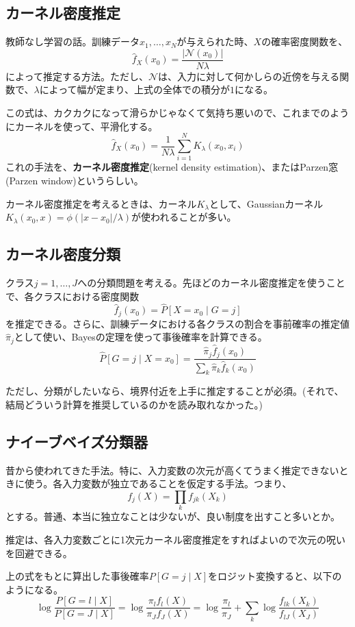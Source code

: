 \documentclass{jsarticle}
\begin{document}
\subsection{カーネル密度推定}
教師なし学習の話。訓練データ$x_{1},\dots,x_{N}$が与えられた時、$X$の確率密度関数を、
\[
  \hat{f}_{X}(x_{0})=\frac{|\mathcal{N}(x_{0})|}{N\lambda}
\]
によって推定する方法。ただし、$\mathcal{N}$は、入力に対して何かしらの近傍を与える関数で、$\lambda$によって幅が定まり、上式の全体での積分が$1$になる。

この式は、カクカクになって滑らかじゃなくて気持ち悪いので、これまでのようにカーネルを使って、平滑化する。
\[
  \hat{f}_{X}(x_{0})=\frac{1}{N\lambda}\sum_{i=1}^{N}K_{\lambda}(x_{0},x_{i})
\]
これの手法を、\textbf{カーネル密度推定}(kernel density estimation)、またはParzen窓(Parzen window)というらしい。

カーネル密度推定を考えるときは、カーネル$K_{\lambda}$として、Gaussianカーネル$K_{\lambda}(x_{0},x)=\phi(|x-x_{0}|/\lambda)$が使われることが多い。

\subsection{カーネル密度分類}
クラス$j=1,\dots,J$への分類問題を考える。先ほどのカーネル密度推定を使うことで、各クラスにおける密度関数
\[
  \hat{f}_{j}(x_{0})=\hat{P}[X=x_{0} \mid G=j]
\]
を推定できる。さらに、訓練データにおける各クラスの割合を事前確率の推定値$\hat{\pi}_{j}$として使い、Bayesの定理を使って事後確率を計算できる。
\[
  \hat{P}[G=j\mid X=x_{0}]=\frac{\hat{\pi}_{j}\hat{f}_{j}(x_{0})}{\sum_{k}\hat{\pi}_{k}\hat{f}_{k}(x_{0})}
\]

ただし、分類がしたいなら、境界付近を上手に推定することが必須。(それで、結局どういう計算を推奨しているのかを読み取れなかった。)

\subsection{ナイーブベイズ分類器}
昔から使われてきた手法。特に、入力変数の次元が高くてうまく推定できないときに使う。各入力変数が独立であることを仮定する手法。つまり、
\[
  f_{j}(X)=\prod_{k}f_{jk}(X_{k})
\]
とする。普通、本当に独立なことは少ないが、良い制度を出すこと多いとか。

推定は、各入力変数ごとに1次元カーネル密度推定をすればよいので次元の呪いを回避できる。

上の式をもとに算出した事後確率$P[G=j \mid X]$をロジット変換すると、以下のようになる。
\[
  \log \frac{P[G=l \mid X]}{P[G=J \mid X]}=\log\frac{\pi_{l}f_{l}(X)}{\pi_{J}f_{J}(X)}=\log\frac{\pi_{l}}{\pi_{J}}+\sum_{k}\log\frac{f_{lk}(X_k)}{f_{lJ}(X_J)}
\]
\end{document}
